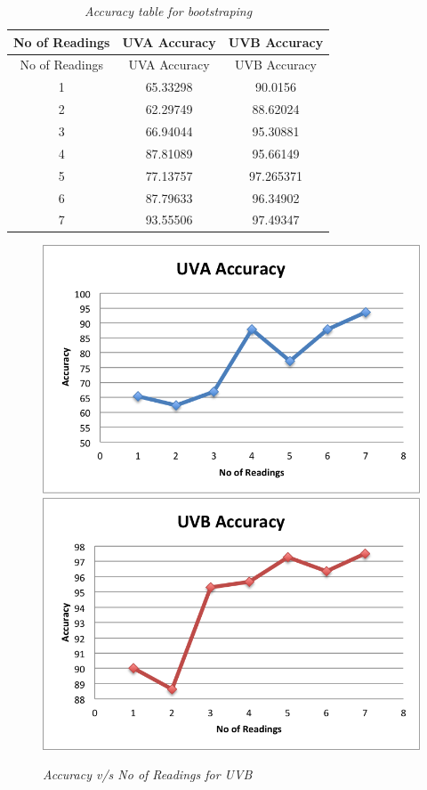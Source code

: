 \documentclass[12pt,fullpage,doublespace]{article}
\begin{document}
\newpage
\begin{table}
\centering
\begin{tabular}{|c|c|c|}
\hline
No of Readings & UVA Accuracy & UVB Accuracy \\
\hline
No of Readings & UVA Accuracy & UVB Accuracy \\
\hline 
1 & 65.33298 & 90.0156\\
\hline
2 & 62.29749 & 88.62024\\
\hline
3 & 66.94044 & 95.30881\\
\hline
4 & 87.81089 & 95.66149\\
\hline
5 & 77.13757 & 97.265371\\
\hline
6 & 87.79633 & 96.34902\\
\hline
7 & 93.55506 & 97.49347\\
\hline
\end{tabular}
\caption{\small \sl Accuracy table for bootstraping}
\end{table}


\begin{figure}
\begin{center}
\includegraphics[scale=0.5]{segment3uva.png}
\includegraphics[scale=0.5]{segment3uvb.png}
\caption{\small \sl Accuracy v/s No of Readings for UVB}
\label{fig:lessReadings}
\end{center}
\end{figure}
\end{document}
